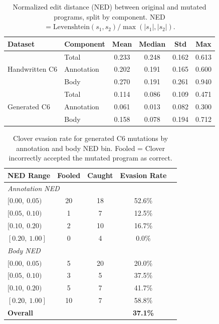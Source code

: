 \begin{table}[h]
\centering
\caption{Normalized edit distance (NED) between original and mutated programs,
split by component. NED $= \text{Levenshtein}(s_1, s_2) / \max(|s_1|, |s_2|)$.}
\label{tab:edit-distance}
\begin{tabular}{llcccc}
\toprule
\textbf{Dataset} & \textbf{Component} & \textbf{Mean} & \textbf{Median} & \textbf{Std} & \textbf{Max} \\
\midrule
\multirow{3}{*}{Handwritten C6}
  & Total      & 0.233 & 0.248 & 0.162 & 0.613 \\
  & Annotation & 0.202 & 0.191 & 0.165 & 0.600 \\
  & Body       & 0.270 & 0.191 & 0.261 & 0.940 \\
\midrule
\multirow{3}{*}{Generated C6}
  & Total      & 0.114 & 0.086 & 0.109 & 0.471 \\
  & Annotation & 0.061 & 0.013 & 0.082 & 0.300 \\
  & Body       & 0.158 & 0.078 & 0.194 & 0.712 \\
\bottomrule
\end{tabular}
\end{table}


\begin{table}[h]
\centering
\caption{Clover evasion rate for generated C6 mutations by annotation and body
NED bin. Fooled = Clover incorrectly accepted the mutated program as correct.}
\label{tab:evasion-by-ned}
\begin{tabular}{lcccc}
\toprule
\textbf{NED Range} & \textbf{Fooled} & \textbf{Caught} & \textbf{Evasion Rate} \\
\midrule
\multicolumn{4}{l}{\textit{Annotation NED}} \\
$[0.00,\ 0.05)$ & 20 & 18 & 52.6\% \\
$[0.05,\ 0.10)$ &  1 &  7 & 12.5\% \\
$[0.10,\ 0.20)$ &  2 & 10 & 16.7\% \\
$[0.20,\ 1.00]$ &  0 &  4 &  0.0\% \\
\midrule
\multicolumn{4}{l}{\textit{Body NED}} \\
$[0.00,\ 0.05)$ &  5 & 20 & 20.0\% \\
$[0.05,\ 0.10)$ &  3 &  5 & 37.5\% \\
$[0.10,\ 0.20)$ &  5 &  7 & 41.7\% \\
$[0.20,\ 1.00]$ & 10 &  7 & 58.8\% \\
\midrule
\multicolumn{3}{l}{\textbf{Overall}} & \textbf{37.1\%} \\
\bottomrule
\end{tabular}
\end{table}
